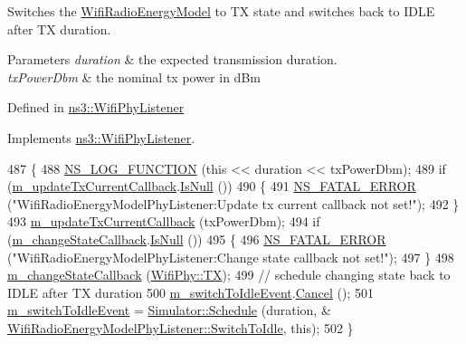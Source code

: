Switches the \hyperlink{classns3_1_1WifiRadioEnergyModel}{Wifi\+Radio\+Energy\+Model} to TX state and switches back to I\+D\+LE after TX duration. 


\begin{DoxyParams}{Parameters}
{\em duration} & the expected transmission duration. \\
\hline
{\em tx\+Power\+Dbm} & the nominal tx power in d\+Bm\\
\hline
\end{DoxyParams}
Defined in \hyperlink{classns3_1_1WifiPhyListener}{ns3\+::\+Wifi\+Phy\+Listener} 

Implements \hyperlink{classns3_1_1WifiPhyListener_ae9c765ad70d871fc0dbdc31dac0eea12}{ns3\+::\+Wifi\+Phy\+Listener}.


\begin{DoxyCode}
487 \{
488   \hyperlink{log-macros-disabled_8h_a90b90d5bad1f39cb1b64923ea94c0761}{NS\_LOG\_FUNCTION} (\textcolor{keyword}{this} << duration << txPowerDbm);
489   \textcolor{keywordflow}{if} (\hyperlink{classns3_1_1WifiRadioEnergyModelPhyListener_a718497ae1babeb0343b4c4ec4122be85}{m\_updateTxCurrentCallback}.\hyperlink{classns3_1_1Callback_aa8e27826badbf37f84763f36f70d9b54}{IsNull} ())
490     \{
491       \hyperlink{group__fatal_ga5131d5e3f75d7d4cbfd706ac456fdc85}{NS\_FATAL\_ERROR} (\textcolor{stringliteral}{"WifiRadioEnergyModelPhyListener:Update tx current callback not set!"});
492     \}
493   \hyperlink{classns3_1_1WifiRadioEnergyModelPhyListener_a718497ae1babeb0343b4c4ec4122be85}{m\_updateTxCurrentCallback} (txPowerDbm);
494   \textcolor{keywordflow}{if} (\hyperlink{classns3_1_1WifiRadioEnergyModelPhyListener_a098270b7f1cf683db02246ccfd280990}{m\_changeStateCallback}.\hyperlink{classns3_1_1Callback_aa8e27826badbf37f84763f36f70d9b54}{IsNull} ())
495     \{
496       \hyperlink{group__fatal_ga5131d5e3f75d7d4cbfd706ac456fdc85}{NS\_FATAL\_ERROR} (\textcolor{stringliteral}{"WifiRadioEnergyModelPhyListener:Change state callback not set!"});
497     \}
498   \hyperlink{classns3_1_1WifiRadioEnergyModelPhyListener_a098270b7f1cf683db02246ccfd280990}{m\_changeStateCallback} (\hyperlink{classns3_1_1WifiPhy_af97408fa76f99797497b492758467143a69db14ff4bed82ca0242f8b09065ff09}{WifiPhy::TX});
499   \textcolor{comment}{// schedule changing state back to IDLE after TX duration}
500   \hyperlink{classns3_1_1WifiRadioEnergyModelPhyListener_ad9c8198a14de28a5a70555d74d4a3000}{m\_switchToIdleEvent}.\hyperlink{classns3_1_1EventId_a993ae94e48e014e1afd47edb16db7a11}{Cancel} ();
501   \hyperlink{classns3_1_1WifiRadioEnergyModelPhyListener_ad9c8198a14de28a5a70555d74d4a3000}{m\_switchToIdleEvent} = \hyperlink{classns3_1_1Simulator_a671882c894a08af4a5e91181bf1eec13}{Simulator::Schedule} (duration, &
      \hyperlink{classns3_1_1WifiRadioEnergyModelPhyListener_a8b9bee042c268ee5c53a594c7faa2d96}{WifiRadioEnergyModelPhyListener::SwitchToIdle}, \textcolor{keyword}{this});
502 \}
\end{DoxyCode}


